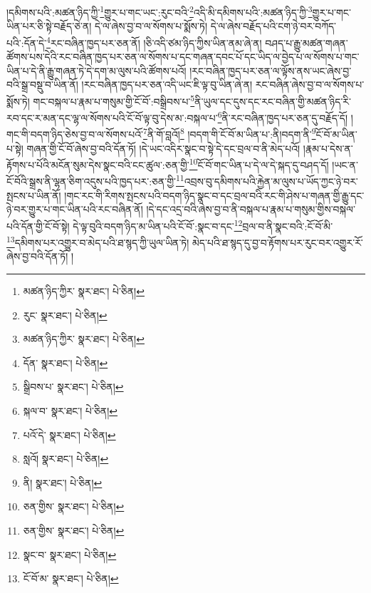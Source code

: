 །དམིགས་པའི་:མཚན་ཉིད་ཀྱི་\footnote{མཚན་ཉིད་ཀྱིར་  སྣར་ཐང་།  པེ་ཅིན། }གྱུར་པ་གང་ཡང་:རུང་བའི་\footnote{རུང་  སྣར་ཐང་།  པེ་ཅིན། }འདི་མི་དམིགས་པའི་:མཚན་ཉིད་ཀྱི་\footnote{མཚན་ཉིད་ཀྱིར་  སྣར་ཐང་།  པེ་ཅིན། }གྱུར་པ་གང་ཡིན་པར་ཅི་སྟེ་བརྗོད་ཅེ་ན། དེ་ལ་ཞེས་བྱ་བ་ལ་སོགས་པ་སྨོས་ཏེ། དེ་ལ་ཞེས་བརྗོད་པའི་ངག་ཉེ་བར་བཀོད་པའི་:དོན་དེ་\footnote{དོན་  སྣར་ཐང་།  པེ་ཅིན། }རང་བཞིན་ཁྱད་པར་ཅན་ནོ། །ཅི་འདི་ཙམ་ཉིད་ཀྱིས་ཡིན་ནམ་ཞེ་ན། བཤད་པ་རྒྱུ་མཚན་གཞན་ཚོགས་པས་དེའི་རང་བཞིན་ཁྱད་པར་ཅན་ལ་སོགས་པ་དང་གཞན་དབང་པོ་དང་ཡིད་ལ་བྱེད་པ་ལ་སོགས་པ་གང་ཡིན་པ་དེ་ནི་རྒྱུ་གཞན་ཏེ་དེ་དག་མ་ལུས་པའི་ཚོགས་པའོ། །རང་བཞིན་ཁྱད་པར་ཅན་ལ་ལྟོས་ནས་ཡང་ཞེས་བྱ་བའི་སྒྲ་བསྡུ་བ་ཡིན་ནོ། །རང་བཞིན་ཁྱད་པར་ཅན་འདི་ཡང་ཇི་ལྟ་བུ་ཡིན་ཞེ་ན། རང་བཞིན་ཞེས་བྱ་བ་ལ་སོགས་པ་སྨོས་ཏེ། གང་བསྐལ་པ་རྣམ་པ་གསུམ་གྱི་ངོ་བོ་:བསྒྲིབས་པ་\footnote{སྒྲིབས་པ་  སྣར་ཐང་།  པེ་ཅིན། }ནི་ཡུལ་དང་དུས་དང་རང་བཞིན་གྱི་མཚན་ཉིད་རི་རབ་དང་ར་མན་དང་ལྷ་ལ་སོགས་པའི་ངོ་བོ་ལྟ་བུ་དེས་མ་:བསྐལ་པ་\footnote{སྐལ་བ་  སྣར་ཐང་།  པེ་ཅིན། }ནི་རང་བཞིན་ཁྱད་པར་ཅན་དུ་བརྗོད་དོ། །གང་གི་བདག་ཉིད་ཅེས་བྱ་བ་ལ་སོགས་པའོ་\footnote{པའོ་དེ་  སྣར་ཐང་།  པེ་ཅིན། }ནི་གོ་བླའོ།\footnote{སླའོ།  སྣར་ཐང་།  པེ་ཅིན། } །བདག་གི་ངོ་བོ་མ་ཡིན་པ་:ནི།བདག་ནི་\footnote{ནི།  སྣར་ཐང་།  པེ་ཅིན། }ངོ་བོ་མ་ཡིན་པ་སྟེ། གཞན་གྱི་ངོ་བོ་ཞེས་བྱ་བའི་དོན་ཏོ། །དེ་ཡང་འདིར་སྣང་བ་སྟེ་དེ་དང་བྲལ་བ་ནི་མེད་པའོ། །རྣམ་པ་དེས་ན་རྟོགས་པ་པོའི་མངོན་སུམ་དེས་སྣང་བའི་ངང་ཚུལ་:ཅན་གྱི་\footnote{ཅན་གྱིས་  སྣར་ཐང་།  པེ་ཅིན། }ངོ་བོ་གང་ཡིན་པ་དེ་ལ་དེ་སྐད་དུ་བཤད་དོ། །ཡང་ན་ངོ་བོའི་སྒྲས་ནི་ལྷན་ཅིག་འདུས་པའི་ཁྱད་པར་:ཅན་གྱི་\footnote{ཅན་གྱིས་  སྣར་ཐང་།  པེ་ཅིན། }འབྲས་བུ་དམིགས་པའི་རྐྱེན་མ་ལུས་པ་ཡོད་ཀྱང་ཉེ་བར་སྤངས་པ་ཡིན་ནོ། །གང་རང་གི་རིགས་སྤངས་པའི་བདག་ཉིད་སྣང་བ་དང་བྲལ་བའི་རང་གི་ཤེས་པ་གཞན་གྱི་རྒྱུ་དང་ཉེ་བར་གྱུར་པ་གང་ཡིན་པའི་རང་བཞིན་ནོ། །དེ་དང་འདྲ་བའི་ཞེས་བྱ་བ་ནི་བསྐལ་པ་རྣམ་པ་གསུམ་གྱིས་བསྐལ་པའི་དོན་གྱི་ངོ་བོ་སྟེ། དེ་ལྟ་བུའི་བདག་ཉིད་མ་ཡིན་པའི་ངོ་བོ་:སྣང་བ་དང་\footnote{སྣང་བ་  སྣར་ཐང་།  པེ་ཅིན། }བྲལ་བ་ནི་སྣང་བའི་:ངོ་བོ་མི་\footnote{ངོ་བོ་མ་  སྣར་ཐང་།  པེ་ཅིན། }དམིགས་པར་འགྱུར་བ་མེད་པའི་ཐ་སྙད་ཀྱི་ཡུལ་ཡིན་ཏེ། མེད་པའི་ཐ་སྙད་དུ་བྱ་བ་རྟོགས་པར་རུང་བར་འགྱུར་རོ་ཞེས་བྱ་བའི་དོན་ཏོ། །
